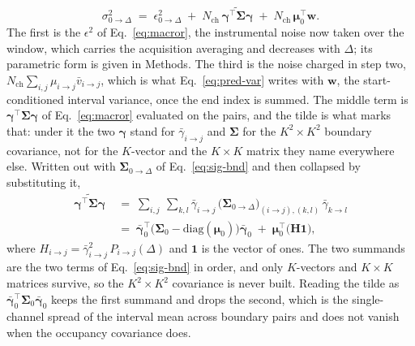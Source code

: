 \begin{equation}
  \sigma^2_{0\to\Delta} \;=\; \epsilon^2_{0\to\Delta}
  \;+\; N_{\mathrm{ch}}\,\widetilde{\bm{\gamma}^\top\bm{\Sigma}\bm{\gamma}}
  \;+\; N_{\mathrm{ch}}\,\bm{\mu}_0^\top\mathbf{w}.
  \label{eq:pred-var}
\end{equation}
The first is the $\epsilon^2$ of Eq.~\ref{eq:macror}, the instrumental noise now taken over the
window, which carries the acquisition averaging and decreases with $\Delta$; its parametric
form is given in Methods. The third is the noise charged in step two,
$N_{\mathrm{ch}}\sum_{i,j}\mu_{i\to j}\bar{v}_{i\to j}$, which
is what Eq.~\ref{eq:pred-var} writes with $\mathbf{w}$, the
start-conditioned interval variance, once the end index is summed. The middle term is
$\bm{\gamma}^\top\bm{\Sigma}\bm{\gamma}$ of Eq.~\ref{eq:macror} evaluated on the pairs, and the
tilde is what marks that: under it the two $\bm{\gamma}$ stand for
$\bar{\gamma}_{i\to j}$ and $\bm{\Sigma}$ for the $K^2\times K^2$ boundary covariance,
not for the $K$-vector and the $K\times K$ matrix they name everywhere else. Written out with $\bm{\Sigma}_{0\to\Delta}$
of Eq.~\ref{eq:sig-bnd} and then collapsed by substituting it,
\begin{align}
  \widetilde{\bm{\gamma}^\top\bm{\Sigma}\bm{\gamma}}
  &\;=\; \sum_{i,j}\ \sum_{k,l}
    \bar{\gamma}_{i\to j}\,
    \bigl(\bm{\Sigma}_{0\to\Delta}\bigr)_{(i\to j),(k,l)}\,
    \bar{\gamma}_{k\to l} \nonumber\\[2pt]
  &\;=\; \bar{\bm{\gamma}}_0^\top\bigl(\bm{\Sigma}_0-\mathrm{diag}(\bm{\mu}_0)\bigr)\bar{\bm{\gamma}}_0
    \;+\; \bm{\mu}_0^\top\bigl(\mathbf{H}\mathbf{1}\bigr),
  \label{eq:tilde}
\end{align}
where $H_{i\to j} = \bar{\gamma}^2_{i\to j}\,P_{i\to j}(\Delta)$ and $\mathbf{1}$
is the vector of ones. The two summands are the two terms of Eq.~\ref{eq:sig-bnd} in order,
and only $K$-vectors and $K\times K$ matrices survive, so the $K^2\times K^2$ covariance is
never built. Reading the tilde as
$\bar{\bm{\gamma}}_0^\top\bm{\Sigma}_0\bar{\bm{\gamma}}_0$ keeps the first summand and drops
the second, which is the single-channel spread of the interval mean across boundary pairs and
does not vanish when the occupancy covariance does.

